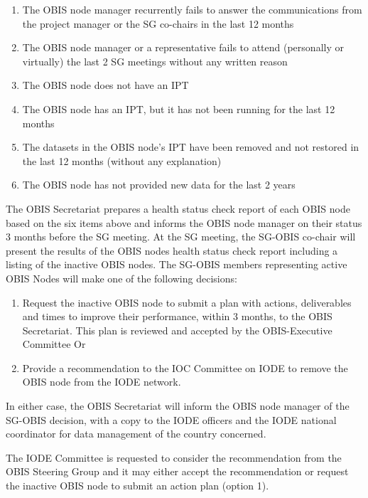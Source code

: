 \documentclass[
  letterpaper,
  DIV=11,
  numbers=noendperiod,
  oneside]{scrreprt}
\providecommand{\tightlist}{%
  \setlength{\itemsep}{0pt}\setlength{\parskip}{0pt}}\usepackage{longtable,booktabs,array}
\begin{document}
\begin{enumerate}
\def\labelenumi{\arabic{enumi}.}
\tightlist
\item
  The OBIS node manager recurrently fails to answer the communications
  from the project manager or the SG co-chairs in the last 12 months
\item
  The OBIS node manager or a representative fails to attend (personally
  or virtually) the last 2 SG meetings without any written reason
\item
  The OBIS node does not have an IPT
\item
  The OBIS node has an IPT, but it has not been running for the last 12
  months
\item
  The datasets in the OBIS node's IPT have been removed and not restored
  in the last 12 months (without any explanation)
\item
  The OBIS node has not provided new data for the last 2 years
\end{enumerate}

The OBIS Secretariat prepares a health status check report of each OBIS
node based on the six items above and informs the OBIS node manager on
their status 3 months before the SG meeting. At the SG meeting, the
SG-OBIS co-chair will present the results of the OBIS nodes health
status check report including a listing of the inactive OBIS nodes. The
SG-OBIS members representing active OBIS Nodes will make one of the
following decisions:

\begin{enumerate}
\def\labelenumi{\arabic{enumi}.}
\tightlist
\item
  Request the inactive OBIS node to submit a plan with actions,
  deliverables and times to improve their performance, within 3 months,
  to the OBIS Secretariat. This plan is reviewed and accepted by the
  OBIS-Executive Committee Or
\item
  Provide a recommendation to the IOC Committee on IODE to remove the
  OBIS node from the IODE network.
\end{enumerate}

In either case, the OBIS Secretariat will inform the OBIS node manager
of the SG-OBIS decision, with a copy to the IODE officers and the IODE
national coordinator for data management of the country concerned.

The IODE Committee is requested to consider the recommendation from the
OBIS Steering Group and it may either accept the recommendation or
request the inactive OBIS node to submit an action plan (option 1).
\end{document}
